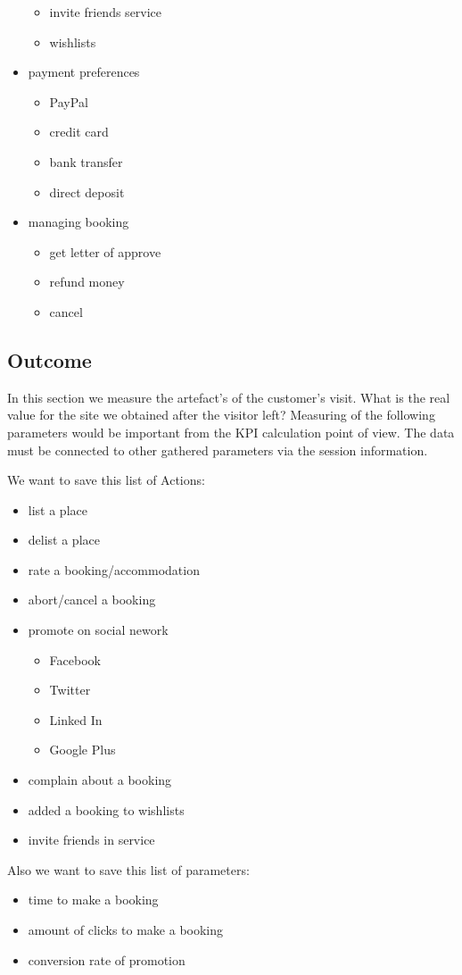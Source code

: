 \begin{itemize}
\begin{itemize}
\begin{itemize}
\end{itemize}
\item invite friends service
\item wishlists
\end{itemize}
\item payment preferences
\begin{itemize}
\item PayPal
\item credit card
\item bank transfer
\item direct deposit
\end{itemize}
\item managing booking
\begin{itemize}
\item get letter of approve
\item refund money
\item cancel
\end{itemize}
\end{itemize}

\subsection{Outcome}
In this section we measure  the artefact's of the customer's visit. What is the real value for the site we obtained after the visitor left? Measuring of the following parameters would be important from the KPI calculation point of view. The data must be connected to other gathered parameters via the session information.

We want to save this list of Actions:
\begin{itemize}
\item list a place
\item delist a place
\item rate a booking/accommodation
\item abort/cancel a booking
\item promote on social nework
\begin{itemize}
\item Facebook
\item Twitter
\item Linked In
\item Google Plus
\end{itemize}
\item complain about a booking
\item added a booking to wishlists
\item invite friends in service
\end{itemize}
Also we want to save this list of parameters:
\begin{itemize}
\item time to make a booking
\item amount of clicks to make a booking
\item conversion rate of promotion
\end{itemize}

